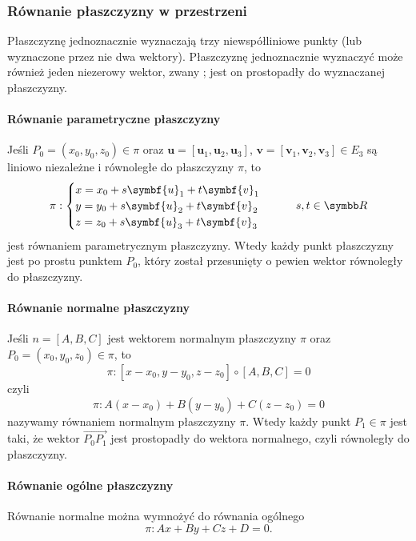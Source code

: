 \subsubsection{Równanie płaszczyzny w przestrzeni}
Płaszczyznę jednoznacznie wyznaczają trzy niewspółliniowe punkty (lub wyznaczone przez nie dwa wektory). Płaszczyznę jednoznacznie wyznaczyć może również jeden niezerowy wektor, zwany ; jest on prostopadły do wyznaczanej płaszczyzny.

\paragraph{Równanie parametryczne płaszczyzny} Jeśli $P_0 = (x_0, y_0, z_0) \in \pi$ oraz $\symbf{u} = [\symbf{u}_1, \symbf{u}_2, \symbf{u}_3]$, $\symbf{v} = [\symbf{v}_1, \symbf{v}_2, \symbf{v}_3] \in E_3$ są liniowo niezależne i równoległe do płaszczyzny $\pi$, to
\begin{equation} \pi : \begin{cases}
    x = x_0 + s\symbf{u}_1 + t\symbf{v}_1 \\
    y = y_0 + s\symbf{u}_2 + t\symbf{v}_2 \\
    z = z_0 + s\symbf{u}_3 + t\symbf{v}_3
\end{cases} \qquad s, t \in \RR \end{equation}
jest równaniem parametrycznym płaszczyzny. Wtedy każdy punkt płaszczyzny jest po prostu punktem $P_0$, który został przesunięty o pewien wektor równoległy do płaszczyzny.

\paragraph{Równanie normalne płaszczyzny} Jeśli $n = [A, B, C]$ jest wektorem normalnym płaszczyzny $\pi$ oraz $P_0 = (x_0, y_0, z_0) \in \pi$, to
\[ \pi : [x - x_0, y - y_0, z - z_0] \circ [A, B, C] = 0 \]
czyli
\begin{equation}
    \pi : A(x - x_0) + B(y - y_0) + C(z - z_0) = 0
\end{equation}
nazywamy równaniem normalnym płaszczyzny $\pi$. Wtedy każdy punkt $P_1 \in \pi$ jest taki, że wektor $\overrightarrow{P_0P_1}$ jest prostopadły do wektora normalnego, czyli równoległy do płaszczyzny.

\paragraph{Równanie ogólne płaszczyzny} Równanie normalne można wymnożyć do równania ogólnego
\begin{equation}
    \pi : Ax + By + Cz + D = 0.
\end{equation}

